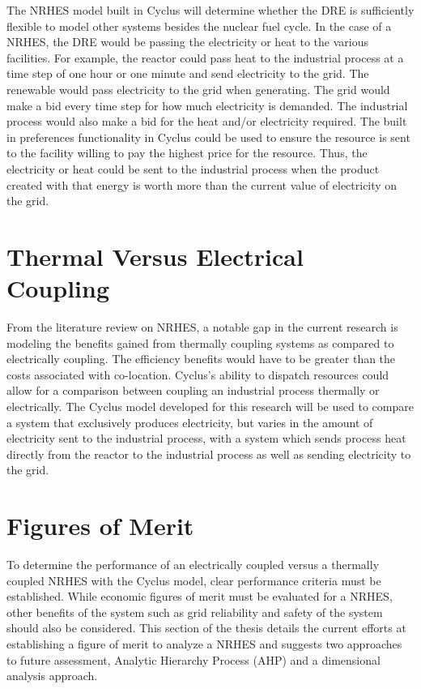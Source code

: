 \documentclass[12pt]{UIdahoMastersThesis}
\begin{document}
The NRHES model built in Cyclus will determine whether the DRE is sufficiently flexible to model other systems besides the nuclear fuel cycle.  In the case of a NRHES, the DRE would be passing the electricity or heat to the various facilities.  For example, the reactor could  pass heat to the industrial process at a time step of one hour or one minute and send electricity to the grid.  The renewable would pass electricity to the grid when generating.  The grid would make a bid every time step for how much electricity is demanded.  The industrial process would also make a bid for the heat and/or electricity required.  The built in preferences functionality in Cyclus could be used to ensure the resource is sent to the facility willing to pay the highest price for the resource.  Thus, the electricity or heat could be sent to the industrial process when the product created with that energy is worth more than the current value of electricity on the grid.
\chapter{Thermal Versus Electrical Coupling}
From the literature review on NRHES, a notable gap in the current research is modeling the benefits gained from thermally coupling systems as compared to electrically coupling.  The efficiency benefits would have to be greater than the costs associated with co-location.  Cyclus's ability to dispatch resources could allow for a comparison between coupling an industrial process thermally or electrically. The Cyclus model developed for this research will be used to compare a system that exclusively produces electricity, but varies in the amount of electricity sent to the industrial process, with a system which sends process heat directly from the reactor to the industrial process as well as sending electricity to the grid.

\chapter{Figures of Merit}
To determine the performance of an electrically coupled versus a thermally coupled NRHES with the Cyclus model, clear performance criteria must be established.  While economic figures of merit must be evaluated for a NRHES, other benefits of the system such as grid reliability and safety of the system should also be considered. This section of the thesis details the current efforts at establishing a figure of merit to analyze a NRHES and suggests two approaches to future assessment, Analytic Hierarchy Process (AHP) and a dimensional analysis approach.
\end{document}

